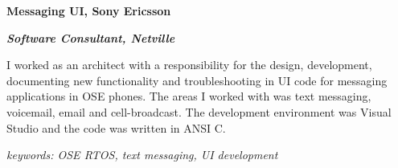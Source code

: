 \item[2006-2008] \textbf{Messaging UI, Sony Ericsson}

\textit{\textbf{Software Consultant, Netville}}

I worked as an architect with a responsibility for the design, development, documenting new functionality and troubleshooting in UI code for messaging applications in OSE phones. The areas I worked with was text messaging, voicemail, email and cell-broadcast. The development environment was Visual Studio and the code was written in ANSI C.

\textit{keywords: OSE RTOS, text messaging, UI development}